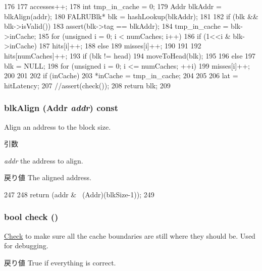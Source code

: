 \begin{DoxyCode}
176 {
177     accesses++;
178     int tmp_in_cache = 0;
179     Addr blkAddr = blkAlign(addr);
180     FALRUBlk* blk = hashLookup(blkAddr);
181 
182     if (blk && blk->isValid()) {
183         assert(blk->tag == blkAddr);
184         tmp_in_cache = blk->inCache;
185         for (unsigned i = 0; i < numCaches; i++) {
186             if (1<<i & blk->inCache) {
187                 hits[i]++;
188             } else {
189                 misses[i]++;
190             }
191         }
192         hits[numCaches]++;
193         if (blk != head){
194             moveToHead(blk);
195         }
196     } else {
197         blk = NULL;
198         for (unsigned i = 0; i <= numCaches; ++i) {
199             misses[i]++;
200         }
201     }
202     if (inCache) {
203         *inCache = tmp_in_cache;
204     }
205 
206     lat = hitLatency;
207     //assert(check());
208     return blk;
209 }
\end{DoxyCode}
\hypertarget{classFALRU_a73119e914b3b83f88be5bde312855cfe}{
\subsubsection[{blkAlign}]{ blkAlign ({\bf Addr} {\em addr}) const}}
\label{classFALRU_a73119e914b3b83f88be5bde312855cfe}
Align an address to the block size. 
\begin{DoxyParams}{引数}
\item[{\em addr}]the address to align. \end{DoxyParams}
\begin{DoxyReturn}{戻り値}
The aligned address. 
\end{DoxyReturn}



\begin{DoxyCode}
247     {
248         return (addr & ~(Addr)(blkSize-1));
249     }
\end{DoxyCode}
\hypertarget{classFALRU_ae1ee541bb22588b6a71650c807efca90}{
\subsubsection[{check}]{\setlength{\rightskip}{0pt plus 5cm}bool check ()}}
\label{classFALRU_ae1ee541bb22588b6a71650c807efca90}
\hyperlink{classCheck}{Check} to make sure all the cache boundaries are still where they should be. Used for debugging. \begin{DoxyReturn}{戻り値}
True if everything is correct. 
\end{DoxyReturn}



